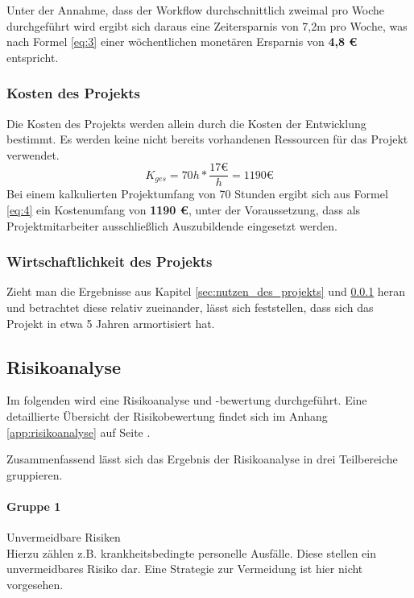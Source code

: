 \documentclass[12pt, xcolor=dvipsnames]{scrartcl}
\begin{document}
Unter der Annahme, dass der Workflow durchschnittlich zweimal pro Woche durchgeführt wird ergibt sich daraus eine Zeitersparnis von 7,2m pro Woche, was nach Formel \ref{eq:3} einer wöchentlichen monetären Ersparnis von \textbf{4,8 \euro{}} entspricht.


\subsubsection{Kosten des Projekts}
\label{sec:kosten_des_projekts}

Die Kosten des Projekts werden allein durch die Kosten der Entwicklung bestimmt. Es werden keine nicht bereits vorhandenen Ressourcen für das Projekt verwendet.
\begin{equation} \label{eq:4}
	K_{ges} = 70h * \frac{17 \euro}{h} = 1190 \euro
\end{equation}
Bei einem kalkulierten Projektumfang von 70 Stunden ergibt sich aus Formel \ref{eq:4} ein Kostenumfang von \textbf{1190 \euro{}}, unter der Voraussetzung, dass als Projektmitarbeiter ausschließlich Auszubildende eingesetzt werden.


\subsubsection{Wirtschaftlichkeit des Projekts}
Zieht man die Ergebnisse aus Kapitel \ref{sec:nutzen_des_projekts} und \ref{sec:kosten_des_projekts} heran und betrachtet diese relativ zueinander, lässt sich feststellen, dass sich das Projekt in etwa 5 Jahren armortisiert hat.


\subsection{Risikoanalyse}

Im folgenden wird eine Risikoanalyse und -bewertung durchgeführt.
Eine detaillierte Übersicht der Risikobewertung findet sich im Anhang \ref{app:risikoanalyse} auf Seite \pageref{app:risikoanalyse}.

Zusammenfassend lässt sich das Ergebnis der Risikoanalyse in drei Teilbereiche gruppieren.

\paragraph{Gruppe 1}
Unvermeidbare Risiken \\
Hierzu zählen z.B. krankheitsbedingte personelle Ausfälle. Diese stellen ein unvermeidbares Risiko dar. Eine Strategie zur Vermeidung ist hier nicht vorgesehen.\\
\end{document}
